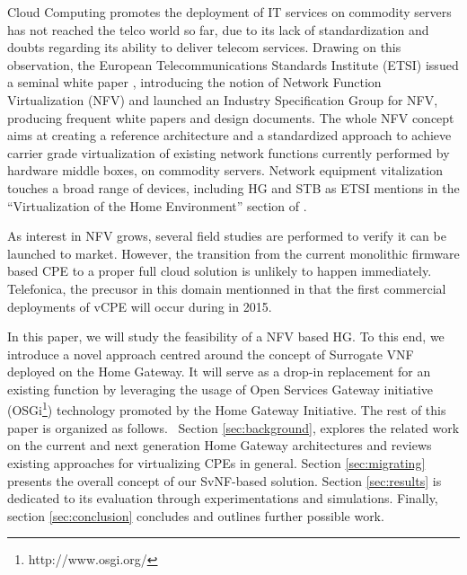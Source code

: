 Cloud Computing promotes the deployment of IT services on commodity servers has not reached the telco world so far, due to its lack of standardization and doubts regarding its ability to deliver telecom services. 
Drawing on this observation, the European Telecommunications Standards Institute (ETSI) issued a seminal white paper \cite{_network_2012}, introducing the notion of Network Function Virtualization (NFV) and launched an Industry Specification Group for NFV, producing frequent white papers and design documents.
The whole NFV concept aims at creating a reference architecture and a standardized approach to achieve carrier grade virtualization of existing network functions currently performed by hardware middle boxes, on commodity servers.
Network equipment vitalization touches a broad range of devices, including HG and STB as ETSI mentions in the “Virtualization of the Home Environment” section of \cite{_network_2013}. 

As interest in NFV grows, several field studies are performed to verify it can be launched to market.
However, the transition from the current monolithic firmware based CPE to a proper full cloud solution is unlikely to happen immediately. Telefonica, the precusor in this domain mentionned in \cite{enrique_blanco_telefonica_2015} that the first commercial deployments of vCPE will occur during in 2015.

In this paper, we will study the feasibility of a NFV based HG.  To this end, we introduce a novel  approach centred around the concept of Surrogate VNF deployed on the Home Gateway.
It will serve as a drop-in replacement for an existing function by leveraging the usage of Open Services Gateway initiative (OSGi\footnote{http://www.osgi.org/}) technology promoted by the Home Gateway Initiative.
The rest of this paper is organized as follows.
~Section \ref{sec:background}, explores the related work on the current and next generation Home Gateway architectures and reviews existing approaches for virtualizing CPEs in general.
Section \ref{sec:migrating} presents the overall concept of our SvNF-based solution. Section \ref{sec:results} is dedicated to its evaluation through experimentations and simulations. Finally, section \ref{sec:conclusion} concludes and outlines further possible work.


